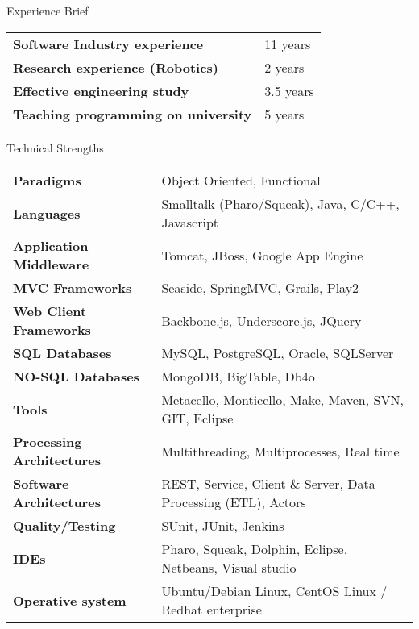 \documentclass{resume} %
\begin{document}
\begin{rSection}{Experience Brief}

\begin{tabular}{ @{} >{\bfseries}l @{\hspace{6ex}} l }

Software Industry experience & 11 years \\
Research experience (Robotics) & 2 years \\
Effective engineering study & 3.5 years \\
Teaching programming on university & 5 years \\

\end{tabular}
\end{rSection}
\begin{rSection}{Technical Strengths}

\begin{tabular}{ @{} >{\bfseries}l @{\hspace{6ex}} l }
Paradigms & Object Oriented, Functional \\
Languages & Smalltalk (Pharo/Squeak), Java, C/C++, Javascript  \\
Application Middleware & Tomcat, JBoss, Google App Engine \\
MVC Frameworks &  Seaside, SpringMVC, Grails, Play2 \\
Web Client Frameworks & Backbone.js, Underscore.js, JQuery \\
SQL Databases & MySQL, PostgreSQL, Oracle, SQLServer  \\
NO-SQL Databases & MongoDB, BigTable, Db4o  \\
Tools & Metacello, Monticello, Make, Maven, SVN, GIT, Eclipse \\
Processing Architectures & Multithreading, Multiprocesses, Real time \\
Software Architectures & REST, Service,  Client \& Server, Data Processing (ETL), Actors\\
Quality/Testing & SUnit, JUnit, Jenkins \\
IDEs & Pharo, Squeak, Dolphin, Eclipse, Netbeans, Visual studio \\
Operative system & Ubuntu/Debian Linux, CentOS Linux / Redhat enterprise \\
\end{tabular}

\end{rSection}
\end{document}

